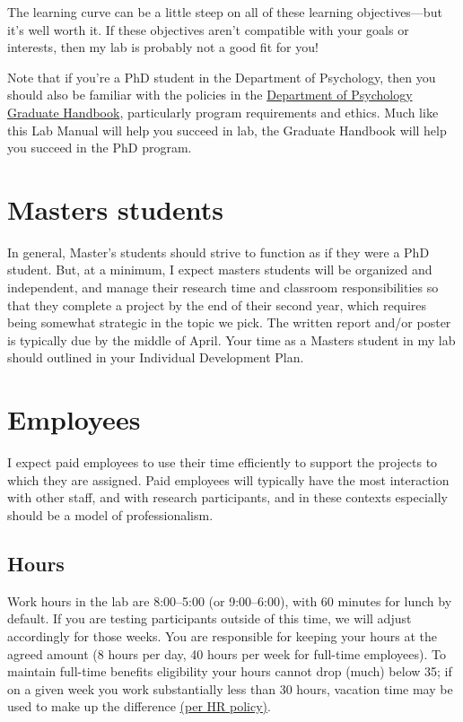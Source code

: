 \documentclass[letterpaper,12pt,oneside]{memoir}
\begin{document}
The learning curve can be a little steep on all of these learning objectives---but it's well worth it. If these objectives aren't compatible with your goals or interests, then my lab is probably not a good fit for you!

Note that if you're a PhD student in the Department of Psychology, then you should also be familiar with the policies in the \href{https://docs.google.com/document/d/1hoxVN1ol7ZGB10_9N0k8yVxkRDJLcMVYGTp-Nwgbm94/edit}{Department of Psychology Graduate Handbook}, particularly program requirements and ethics. Much like this Lab Manual will help you succeed in lab, the Graduate Handbook will help you succeed in the PhD program.


\section{Masters students}

In general, Master's students should strive to function as if they were a PhD student. But, at a minimum, I expect masters students will be organized and independent, and manage their research time and classroom responsibilities so that they complete a project by the end of their second year, which requires being somewhat strategic in the topic we pick. The written report and/or poster is typically due by the middle of April. Your time as a Masters student in my lab should outlined in your Individual Development Plan. 


\section{Employees}

I expect paid employees to use their time efficiently to support the projects to which they are assigned. Paid employees will typically have the most interaction with other staff, and with research participants, and in these contexts especially should be a model of professionalism.

\subsection{Hours}
Work hours in the lab are 8:00--5:00 (or 9:00--6:00), with 60 minutes for lunch by default. If you are testing participants outside of this time, we will adjust accordingly for those weeks. You are responsible for keeping your hours at the agreed amount (8 hours per day, 40 hours per week for full-time employees). To maintain full-time benefits eligibility your hours cannot drop (much) below 35; if on a given week you work substantially less than 30 hours, vacation time may be used to make up the difference \href{http://www.temple.edu/hr/departments/employeerelations/documents/Employee_Manual_Feb_2016.pdf}{(per HR policy)}.
\end{document}
